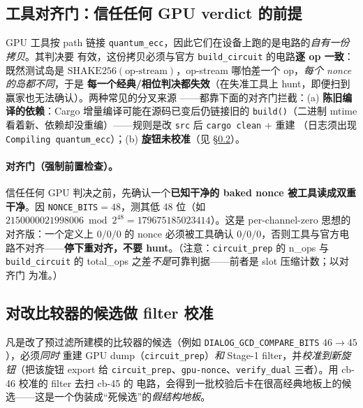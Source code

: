 \documentclass[11pt]{ctexart}
\let\c\lstinline
\begin{document}
\subsection{工具对齐门：信任任何 GPU verdict 的前提}
\label{ssec:gate}
GPU 工具按 path 链接 \c{quantum_ecc}，因此它们在设备上跑的是电路的\emph{自有一份拷贝}。其判决要
有效，这份拷贝必须与官方 \c{build_circuit} 的电路\textbf{逐 op 一致}：既然测试岛是
$\text{SHAKE256}(\text{op-stream})$，op-stream 哪怕差一个 op，\emph{每个 nonce 的岛都不同}，于是
\textbf{每一个经典/相位判决都失效}（在失准工具上 hunt，即便扫到赢家也无法确认）。两种常见的分叉来源
——都靠下面的对齐门拦截：(a) \textbf{陈旧编译的依赖}：Cargo 增量编译可能在源码已变后仍链接旧的
\c{build()}（二进制 mtime 看着新、依赖却没重编）——规则是改 \c{src} 后 \c{cargo clean} + 重建
（日志须出现 \texttt{Compiling quantum\_ecc}）；(b) \textbf{旋钮未校准}（见 §\ref{ssec:calib}）。

\paragraph{对齐门（强制前置检查）。}信任任何 GPU 判决之前，先确认一个\textbf{已知干净的 baked
nonce 被工具读成双重干净}。因 \c{NONCE_BITS}$=48$，测其低 48 位（如 $2150000021998006 \bmod 2^{48}
= 179675185023414$）。这是 per-channel-zero 思想的对齐版：一个定义上 $0/0/0$ 的 nonce 必须被工具确认
$0/0/0$，否则工具与官方电路不对齐——\textbf{停下重对齐，不要 hunt}。（注意：\c{circuit_prep} 的
n\_ops 与 \c{build_circuit} 的 total\_ops 之差\emph{不是}可靠判据——前者是 slot 压缩计数；以对齐门
为准。）

\subsection{对改比较器的候选做 filter 校准}
\label{ssec:calib}
凡是改了预过滤所建模的比较器的候选（例如 \c{DIALOG_GCD_COMPARE_BITS} $46{\to}45$），必须\emph{同时}
重建 GPU dump（\c{circuit_prep}）\emph{和} Stage-1 filter，并\emph{校准到新旋钮}（把该旋钮 export
给 \c{circuit_prep}、\c{gpu-nonce}、\c{verify_dual} 三者）。用 cb-46 校准的 filter 去扫 cb-45 的
电路，会得到一批校验后卡在很高经典地板上的候选——这是一个伪装成``死候选''的\emph{假结构地板}。
\end{document}
